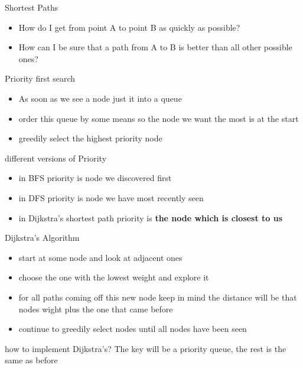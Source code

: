 \documentclass{beamer}
\begin{document}
\begin{frame}{Shortest Paths}
    \begin{itemize}
        \item How do I get from point A to point B as quickly as possible?
        \item How can I be sure that a path from A to B is better than all other possible ones?
    \end{itemize}
\end{frame}
\begin{frame}{Priority first search}
    \begin{itemize}
        \item As soon as we see a node just it into a queue
        \item order this queue by some means so the node we want the most is at the start
        \item greedily select the highest priority node
    \end{itemize}
\end{frame}
\begin{frame}{different versions of Priority}
    \begin{itemize}
        \item in BFS priority is node we discovered first
        \item in DFS priority is node we have most recently seen
        \item in Dijkstra's shortest path priority is \textbf{the node which is closest to us}
    \end{itemize}
\end{frame}
\begin{frame}{Dijkstra's Algorithm}
    \begin{itemize}
        \item start at some node and look at adjacent ones
        \item choose the one with the lowest weight and explore it
        \item for all paths coming off this new node keep in mind the distance will be that nodes wight plus the one that came before
        \item continue to greedily select nodes until all nodes have been seen
    \end{itemize}
\end{frame}
\begin{frame}{how to implement Dijkstra's?}
    The key will be a priority queue, the rest is the same as before
\end{frame}
\end{document}

